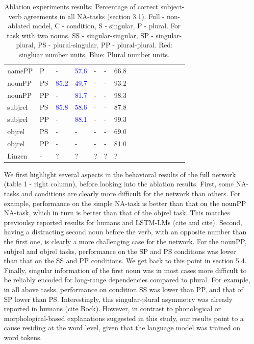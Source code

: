 \begin{center}
\begin{table}[ht]
\begin{tabular}{|P{1.4cm}|P{0.4cm}||P{0.6cm}|P{0.6cm}|P{0.6cm}|P{0.6cm}|P{0.6cm}|P{0.6cm}|P{0.6cm}|P{0.6cm}|P{0.6cm}|P{0.6cm}|P{0.6cm}|P{0.6cm}||P{0.6cm}|}
\B namePP & \B P & - &  \textcolor{blue}{57.6} &  - &  - &  66.8 \\

\B nounPP & \B PS &  \textcolor{blue}{85.2} &  \textcolor{blue}{49.7} & - &  - &  93.2 \\

\B nounPP & \B PP &  - &  \textcolor{blue}{81.7} &  - &  - &  98.3 \\

\B subjrel & \B PS &  \textcolor{blue}{85.8}  &  \textcolor{blue}{58.6}  &  - &  - &  87.8 \\

\B subjrel & \B PP &  - &  \textcolor{blue}{88.1} &  - &  - &  99.3 \\

\B objrel & \B PS & - &  - &  - &  - &  69.0 \\

\B objrel & \B PP &  - &  - &  - &  - &  81.0 \\
\hline
\hline
\B Linzen & \B - &  ? &  ? &  ? &  ? &  ? \\
\hline
\end{tabular}
\caption{Ablation experiments results: Percentage of correct subject-verb agreements in all NA-tasks (section 3.1). Full - non-ablated model, C - condition, S - singular, P - plural. For task with two nouns, SS - singular-singular, SP - singular-plural, PS - plural-singular, PP - plural-plural. Red: singluar number units, Blue: Plural number units.}
\end{table}
\end{center}

We first highlight several aspects in the behavioral results of the full network (table 1 - right column), before looking into the ablation results. First, some NA-tasks and conditions are clearly more difficult for the network than others. For example, performance on the simple NA-task is better than that on the nounPP NA-task, which in turn is better than that of the objrel task. This matches previoulsy reported results for humans and LSTM-LMs (cite and cite). Second, having a distracting second noun before the verb, with an opposite number than the first one, is clearly a more challenging case for the network. For the nounPP, subjrel and objrel tasks, performance on the SP and PS conditions was lower than that on the SS and PP conditions. We get back to this point in section 5.4. Finally, singular information of the first noun was in most cases more difficult to be reliably encoded for long-range dependencies compared to plural. For example, in all above tasks, performance on condition SS was lower than PP, and that of SP lower than PS. Interestingly, this singular-plural asymmetry was already reported in humans (cite Bock). However, in contrast to phonological or morphological-based explanations suggested in this study, our results point to a cause residing at the word level, given that the language model was trained on word tokens.

